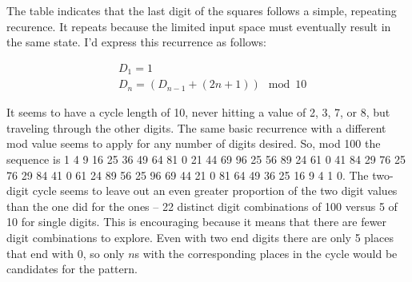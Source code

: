 The table indicates that the last digit of the squares follows a simple, repeating recurence.  It repeats because
the limited input space must eventually result in the same state.  I'd express this recurrence as follows:

\begin{align*}
&D_1 = 1 \\
&D_n = (D_{n - 1} + (2n + 1)) \mod 10
\end{align*}

It seems to have a cycle length of 10, never hitting a value of 2, 3, 7, or 8, but traveling through the other digits.
The same basic recurrence with a different mod value seems to apply for any number of digits desired.  So, mod 100
the sequence is 1 4 9 16 25 36 49 64 81 0 21 44 69 96 25 56 89 24 61 0 41 84 29 76 25 76 29 84 41 0 61 24 89 56 25 96
 69 44 21 0 81 64 49 36 25 16 9 4 1 0.  The two-digit cycle seems to leave out an even greater proportion of the
two digit values than the one did for the ones -- 22 distinct digit combinations of 100 versus 5 of 10 for single digits.
This is encouraging because it means that there are fewer digit combinations to explore.  Even with two end digits
there are only 5 places that end with 0, so only $n$s with the corresponding places in the cycle would be candidates for the pattern.
